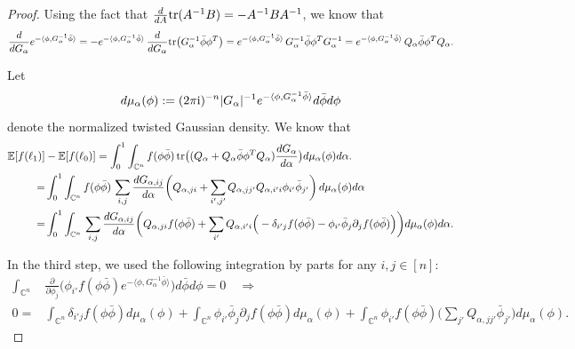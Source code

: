 \documentclass[a4paper, 11pt]{article}
\newcommand{\E}{\mathbb{E}}
\newcommand{\compi}{\textnormal{i}}
\newcommand{\tr}{\textnormal{tr}}
\begin{document}
\begin{proof}
Using the fact that $\frac{d}{d A}\tr(A^{-1}B)=-A^{-1}BA^{-1}$, we know that
\[
\frac{d}{d G_{\alpha}} e^{-\langle \phi,G_\alpha^{-1}\bar{\phi}\rangle}
=-e^{-\langle \phi,G_\alpha^{-1}\bar{\phi}\rangle}\, \frac{d}{dG_\alpha}\tr\big(G_\alpha^{-1}\bar{\phi}\phi^T\big) = e^{-\langle \phi,G_\alpha^{-1}\bar{\phi}\rangle}\, G_\alpha^{-1}\bar{\phi}\phi^TG_\alpha^{-1} = e^{-\langle \phi,G_\alpha^{-1}\bar{\phi}\rangle}\, Q_{\alpha}\bar{\phi}\phi^TQ_{\alpha}.
\]

Let
\begin{equation}        \label{eq:dmualpha}
d\mu_\alpha(\phi):=(2\pi\compi)^{-n}|G_\alpha|^{-1}e^{-\langle \phi,G_\alpha^{-1}\bar{\phi}\rangle}d\bar{\phi}d\phi
\end{equation}
denote the normalized twisted Gaussian density. We know that
\begin{equation*}
\begin{aligned}
\E[f(\ell_1)]& -\E[f(\ell_0)]
=\int_0^1\int_{\mathbb{C}^n}f(\phi\bar{\phi})\,
\tr\big( (Q_{\alpha} + Q_{\alpha}\bar{\phi}\phi^TQ_{\alpha}) \frac{d G_\alpha}{d\alpha}\big) d\mu_\alpha(\phi)d\alpha.\\
=&\int_0^1\int_{\mathbb{C}^n}f(\phi\bar{\phi})\,
\sum_{i,j}\frac{d G_{\alpha,ij}}{d\alpha}\bigg( Q_{\alpha,ji} + \sum_{i',j'}Q_{\alpha,jj'}Q_{\alpha,i'i}\phi_{i'}\bar{\phi}_{j'} \bigg)\,
d\mu_\alpha(\phi)d\alpha \\
=&\int_0^1\int_{\mathbb{C}^n}\,
\sum_{i,j}\frac{d G_{\alpha,ij}}{d\alpha}\bigg( Q_{\alpha,ji}f(\phi\bar{\phi}) + \sum_{i'}Q_{\alpha,i'i}\Big(-\delta_{i'j}f(\phi\bar{\phi})-\phi_{i'}\bar{\phi}_j\partial_j f(\phi\bar{\phi})\Big) \bigg)
d\mu_\alpha(\phi)d\alpha.
\end{aligned}
\end{equation*}

In the third step, we used the following integration by parts for any $i,j\in[n]$:
\begin{equation*}
\begin{aligned}
\int_{\mathbb{C}^n} & \frac{\partial}{\partial \phi_j}\big(\phi_{i'}f(\phi\bar{\phi})e^{-\langle \phi, G_\alpha^{-1}\bar{\phi}\rangle}\big)d\bar{\phi} d\phi =0\quad\Rightarrow\\
0=& \int_{\mathbb{C}^n} \delta_{i'j}f(\phi\bar{\phi})d\mu_\alpha(\phi) +
\int_{\mathbb{C}^n}\phi_{i'}\bar{\phi}_j\partial_j f(\phi\bar{\phi})d\mu_\alpha(\phi) +
\int_{\mathbb{C}^n}\phi_{i'}f(\phi\bar{\phi})\bigg(\sum_{j'}Q_{\alpha, jj'}\bar{\phi}_{j'}\bigg)d\mu_\alpha(\phi).
\end{aligned}
\end{equation*}


\end{proof}
\end{document}

